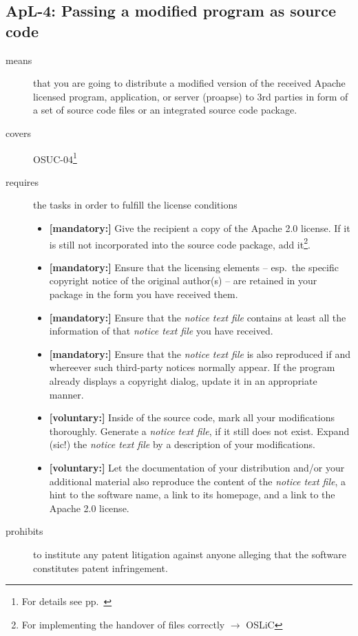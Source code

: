 \subsection{ApL-4: Passing a modified program as source code}
\label{OSUC-04-Apache20} 

\begin{description}
\item[means] that you are going to distribute a modified version of the received
Apache licensed program, application, or server (proapse) to 3rd parties in form
of a set of source code files or an integrated source code package.
\item[covers] OSUC-04\footnote{For details see pp.\ \pageref{OSUC-04-DEF}}
\item[requires] the tasks in order to fulfill the license conditions
\begin{itemize}
  
  \item \textbf{[mandatory:]} Give the recipient a copy of the Apache 2.0
  license. If it is still not incorporated into the source code package, add
  it\footnote{For implementing the handover of files correctly $\rightarrow$
  OSLiC \pageref{DistributingFilesHint}}.

  \item \textbf{[mandatory:]} Ensure that the licensing elements -- esp.\ the
  specific copyright notice of the original author(s) -- are retained in your
  package in the form you have received them.
  
  \item \textbf{[mandatory:]} Ensure that the \emph{notice text file} contains at least
  all the information of that \emph{notice text file} you have received.

  \item \textbf{[mandatory:]} Ensure that the \emph{notice text file} is also
  reproduced if and whereever such third-party notices normally appear. If the
  program already displays a copyright dialog, update it in an appropriate
  manner.
  
  \item \textbf{[voluntary:]} Inside of the source code, mark all your
  modifications thoroughly. Generate a \emph{notice text file}, if it still does not
  exist. Expand (sic!) the \emph{notice text file} by a description of your
  modifications.
   
  \item \textbf{[voluntary:]} Let the documentation of your distribution and/or
  your additional material also reproduce the content of the \emph{notice text
  file}, a hint to the software name, a link to its homepage, and a link to the
  Apache 2.0 license.
  
 \end{itemize}
 
\item[prohibits] to institute any patent litigation against anyone alleging that
the software constitutes patent infringement.

\end{description}

